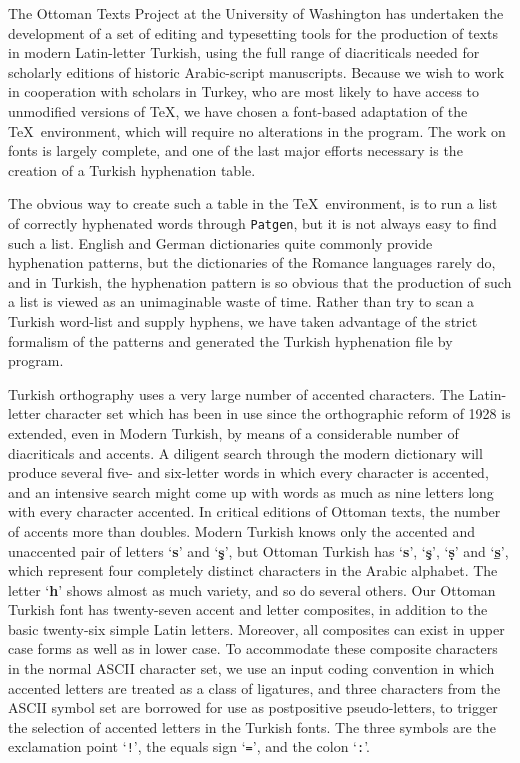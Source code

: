 The Ottoman Texts Project at the University of Washington has
undertaken the development of a set of editing and typesetting
tools for the production of texts in modern Latin-letter Turkish,
using the full range of diacriticals needed for scholarly editions
of historic Arabic-script manuscripts.  Because we wish to work
in cooperation with scholars in Turkey, who are most likely to
have access to unmodified versions of \TeX, we have chosen
a font-based adaptation of the \TeX\ environment, which will require
no alterations in the program.  The work on fonts is largely complete,
and one of the last major efforts necessary is the creation of
a Turkish hyphenation table.  

The obvious way to create such a table in the \TeX\ environment, is to
run a list of correctly hyphenated words through {\tt Patgen}, but
it is not always easy to find such a list.  English and German dictionaries
quite commonly provide hyphenation patterns, but the dictionaries of
the Romance languages rarely do, and in Turkish, the hyphenation pattern
is so obvious that the production of such a list is viewed as an
unimaginable waste of time.  Rather than try to scan a Turkish
word-list and supply hyphens, we have taken advantage of the strict formalism
of the patterns and generated the Turkish hyphenation file by
program.  

Turkish orthography uses a very large number of accented characters.
The Latin-letter character set which has been in
use since the orthographic reform of 1928 is extended, even in Modern
Turkish, by means of a considerable number of diacriticals and accents.  A
diligent search through the modern dictionary will produce several
five- and six-letter words in which every character is accented, and an
intensive search might come up with words as much as nine letters long
with every character accented.  In critical editions of Ottoman texts,
the number of accents more than doubles.  Modern Turkish knows only
the accented and unaccented pair of letters `{\bf s}' and `{\bf\c s}', but
Ottoman Turkish has `{\bf s}', `{\bf\c s}', `{\bf\d s}' and `{\bf\b s}', which
represent four completely distinct characters in the Arabic alphabet.
The letter `{\bf h}' shows almost as much variety, and so do several
others.  Our Ottoman Turkish font has twenty-seven accent and letter
composites, in addition to the basic twenty-six simple Latin letters.
Moreover, all composites can exist in upper case forms as well as in
lower case.  To accommodate these composite characters in the normal
{\ninerm ASCII} character set, 
we use an input coding convention in which accented
letters are treated as a class of ligatures, and three characters from the
{\ninerm ASCII} symbol set are borrowed for use as postpositive
pseudo-letters, to trigger the selection of accented letters in
the Turkish fonts.  The three symbols are the exclamation
point `{\tt!}', the equals sign `{\tt=}', and the colon `{\tt:}'.

